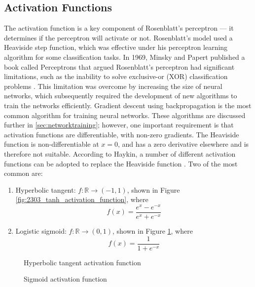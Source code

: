 
\subsection{Activation Functions}\label{sec:activation_functions}
The activation function is a key component of Rosenblatt's perceptron --- it determines if the perceptron will activate or not. Rosenblatt's model used a Heaviside step function, which was effective under his perceptron learning algorithm for some classification tasks. In 1969, Minsky and Papert published a book called Perceptrons that argued Rosenblatt's perceptron had significant limitations, such as the inability to solve exclusive-or (XOR) classification problems \cite{Minsky1969}. This limitation was overcome by increasing the size of neural networks, which subsequently required the development of new algorithms to train the networks efficiently. Gradient descent using backpropagation \cite{Werbos1982} is the most common algorithm for training neural networks. These algorithms are discussed further in \textsection \ref{sec:networktraining}; however, one important requirement is that activation functions are differentiable, with non-zero gradients. The Heaviside function is non-differentiable at $x = 0$, and has a zero derivative elsewhere and is therefore not suitable. According to Haykin, a number of different activation functions can be adopted to replace the Heaviside function \cite{Haykin99}. Two of the most common are:
\begin{enumerate}
	\item Hyperbolic tangent: $f:\mathbb{R} \to (-1,1)$, shown in Figure \ref{fig:2303_tanh_activation_function}, where
	\begin{equation}
		f(x) = \frac{e^x - e^{-x}}{e^x + e^{-x}}
	\end{equation}
	\item Logistic sigmoid: $f:\mathbb{R} \to (0,1)$, shown in Figure \ref{fig:2304_sigmoid_activation_function}, where
	\begin{equation}
		f(x) = \frac{1}{1 + e^{-x}}
	\end{equation}
\end{enumerate}

\begin{figure}[h]
	\centering
	\begin{minipage}[t]{0.45\textwidth}
		\centering
		
		\caption[Hyperbolic tangent activation function]{Hyperbolic tangent activation function}
		\label{fig:2303_tanh_activation_function}
	\end{minipage}
	\hspace{1cm}
	\begin{minipage}[t]{0.45\textwidth}
		\centering
		
		\caption[Sigmoid activation function]{Sigmoid activation function}
		\label{fig:2304_sigmoid_activation_function}
	\end{minipage}
\end{figure}

